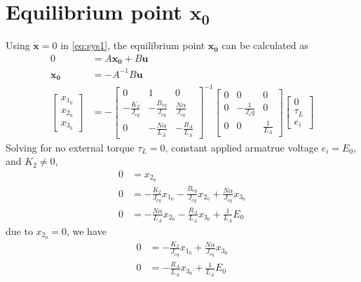 \documentclass[]{article}
\begin{document}
\section{Equilibrium point $\mathbf{x_0}$}
Using $\mathbf{\dot{x}}=0$ in \eqref{eq:sys1}, the equilibrium point $\mathbf{x_0}$ can be calculated as 
\begin{align}
	0            & = A \mathbf{x_0} +B \mathbf{u} \\
	\mathbf{x_0} & = - A^{-1} B \mathbf{u} \\
	\begin{bmatrix}
		x_{1_0} \\
		x_{2_0} \\
		x_{3_0}
	\end{bmatrix}
	& = - 
	\begin{bmatrix}
		0                   & 1                      & 0                       \\
		-\frac{K_2}{J_{eq}} & -\frac{B_{eq}}{J_{eq}} & \frac{N \alpha}{J_{eq}} \\
		0                   & -\frac{N \alpha}{L_A}  & -\frac{R_A}{L_A}
	\end{bmatrix}^{-1}
	\begin{bmatrix}
		0 & 0               & 0             \\
		0 & -\frac{1}{J_eq} & 0             \\
		0 & 0               & \frac{1}{L_A}
	\end{bmatrix}
	\begin{bmatrix}
		0      \\
		\tau_L \\
		e_i
	\end{bmatrix}
\end{align}
Solving for no external torque $\tau_L=0$, constant applied armatrue voltage $e_i=E_0$, and $K_2 \neq 0$,
\begin{align*}
	0 & = x_{2_0}                                                                                      \\
	0 & = -\frac{K_2}{J_{eq}} x_{1_0} -\frac{B_{eq}}{J_{eq}} x_{2_0} + \frac{N \alpha}{J_{eq}} x_{3_0} \\
	0 & = -\frac{N \alpha}{L_A}  x_{2_0} -\frac{R_A}{L_A} x_{3_0} + \frac{1}{L_A} E_0
\end{align*}
due to $x_{2_0}=0$, we have
\begin{align*}
	0 & = -\frac{K_2}{J_{eq}} x_{1_0} + \frac{N \alpha}{J_{eq}} x_{3_0} \\
	0 & = -\frac{R_A}{L_A} x_{3_0} + \frac{1}{L_A} E_0
\end{align*}
\end{document}
